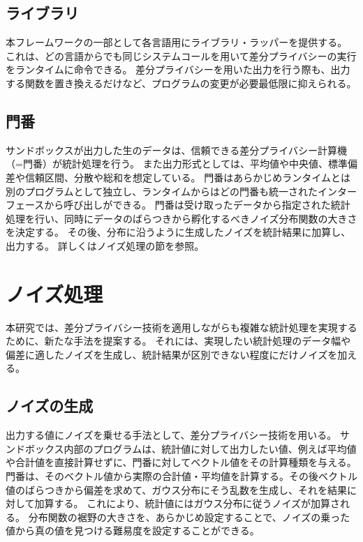 \documentclass[a4paper,11pt]{jreport}
\begin{document}
\subsection{ライブラリ}

本フレームワークの一部として各言語用にライブラリ・ラッパーを提供する。
これは、どの言語からでも同じシステムコールを用いて差分プライバシーの実行をランタイムに命令できる。
差分プライバシーを用いた出力を行う際も、出力する関数を置き換えるだけなど、プログラムの変更が必要最低限に抑えられる。

\subsection{門番}

サンドボックスが出力した生のデータは、信頼できる差分プライバシー計算機（=門番）が統計処理を行う。
また出力形式としては、平均値や中央値、標準偏差や信頼区間、分散や総和を想定している。
門番はあらかじめランタイムとは別のプログラムとして独立し、ランタイムからはどの門番も統一されたインターフェースから呼び出しができる。
門番は受け取ったデータから指定された統計処理を行い、同時にデータのばらつきから孵化するべきノイズ分布関数の大きさを決定する。
その後、分布に沿うように生成したノイズを統計結果に加算し、出力する。
詳しくはノイズ処理の節を参照。

\section{ノイズ処理}
本研究では、差分プライバシー技術を適用しながらも複雑な統計処理を実現するために、新たな手法を提案する。
それには、実現したい統計処理のデータ幅や偏差に適したノイズを生成し、統計結果が区別できない程度にだけノイズを加える。

\subsection{ノイズの生成}

出力する値にノイズを乗せる手法として、差分プライバシー技術を用いる。
サンドボックス内部のプログラムは、統計値に対して出力したい値、例えば平均値や合計値を直接計算せずに、門番に対してベクトル値をその計算種類を与える。
門番は、そのベクトル値から実際の合計値・平均値を計算する。その後ベクトル値のばらつきから偏差を求めて、ガウス分布にそう乱数を生成し、それを結果に対して加算する。
これにより、統計値にはガウス分布に従うノイズが加算される。
分布関数の裾野の大きさを、あらかじめ設定することで、ノイズの乗った値から真の値を見つける難易度を設定することができる。
\end{document}
